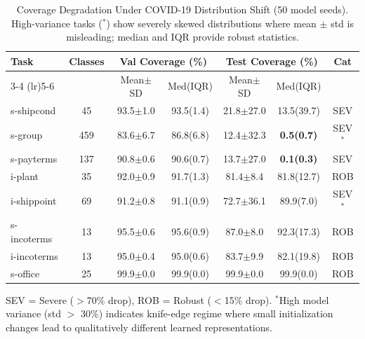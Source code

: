 \begin{table}[t]
\centering
\caption{Coverage Degradation Under COVID-19 Distribution Shift (50 model seeds).
High-variance tasks ($^*$) show severely skewed distributions where mean $\pm$ std
is misleading; median and IQR provide robust statistics.}
\label{tab:main_results}
\small
\begin{tabular}{@{}lcccccc@{}}
\toprule
\multirow{2}{*}{Task} & \multirow{2}{*}{Classes} &
\multicolumn{2}{c}{Val Coverage (\%)} &
\multicolumn{2}{c}{Test Coverage (\%)} &
\multirow{2}{*}{Cat} \\
\cmidrule(lr){3-4} \cmidrule(lr){5-6}
& & Mean$\pm$SD & Med(IQR) & Mean$\pm$SD & Med(IQR) & \\
\midrule
s-shipcond   & 45  & 93.5$\pm$1.0  & 93.5(1.4)  & 21.8$\pm$27.0 & 13.5(39.7) & SEV   \\
s-group      & 459 & 83.6$\pm$6.7  & 86.8(6.8)  & 12.4$\pm$32.3 & \textbf{0.5(0.7)}   & SEV$^*$ \\
s-payterms   & 137 & 90.8$\pm$0.6  & 90.6(0.7)  & 13.7$\pm$27.0 & \textbf{0.1(0.3)}   & SEV   \\
i-plant      & 35  & 92.0$\pm$0.9  & 91.7(1.3)  & 81.4$\pm$8.4  & 81.8(12.7) & ROB   \\
i-shippoint  & 69  & 91.2$\pm$0.8  & 91.1(0.9)  & 72.7$\pm$36.1 & 89.9(7.0)  & SEV$^*$ \\
s-incoterms  & 13  & 95.5$\pm$0.6  & 95.6(0.9)  & 87.0$\pm$8.0  & 92.3(17.3) & ROB   \\
i-incoterms  & 13  & 95.0$\pm$0.4  & 95.0(0.6)  & 83.7$\pm$9.9  & 82.1(19.8) & ROB   \\
s-office     & 25  & 99.9$\pm$0.0  & 99.9(0.0)  & 99.9$\pm$0.0  & 99.9(0.0)  & ROB   \\
\bottomrule
\end{tabular}
\vspace{2mm}

\raggedright
\footnotesize
SEV = Severe ($>$70\% drop), ROB = Robust ($<$15\% drop).
$^*$High model variance (std $>$ 30\%) indicates knife-edge regime where small
initialization changes lead to qualitatively different learned representations.
\end{table}



